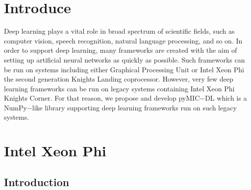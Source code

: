 \documentclass[12pt]{article}
\begin{document}

\renewcommand{\contentsname}{Contents}
\tableofcontents
\pagebreak


\section{Introduce}
Deep learning plays a vital role in broad spectrum of scientific fields, such as computer vision, speech recognition, natural language processing, and so on. In order to support deep learning, many frameworks are created with the aim of setting up artificial neural networks as quickly as possible. Such frameworks can be run on systems including either Graphical Processing Unit or Intel Xeon Phi the second generation Knights Landing coprocessor. However, very few deep learning frameworks can be run on legacy systems containing Intel Xeon Phi Knights Corner. For that reason, we propose and develop pyMIC$-$DL which is a NumPy$-$like library supporting deep learning frameworks run on such legacy systems.

\newpage

\section{Intel Xeon Phi}
\subsection{Introduction}
\end{document}
